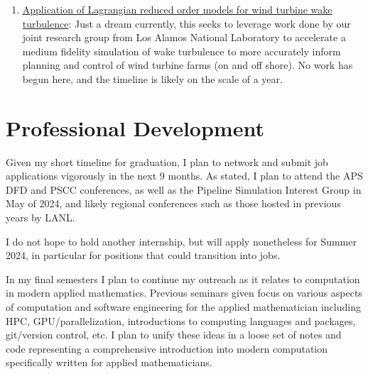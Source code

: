 \documentclass{article}
\begin{document}
\begin{enumerate}
\item \underline{Application of Lagrangian reduced order models for wind turbine wake turbulence}: Just a dream currently, this seeks to leverage work done by our joint research group from Los Alamos National Laboratory to accelerate a medium fidelity simulation of wake turbulence to more accurately inform planning and control of wind turbine farms (on and off shore). No work has begun here, and the timeline is likely on the scale of a year.
    
\end{enumerate}

\section{Professional Development}
Given my short timeline for graduation, I plan to network and submit job applications vigorously in the next 9 months. As stated, I plan to attend the APS DFD and PSCC conferences, as well as the Pipeline Simulation Interest Group in May of 2024, and likely regional conferences such as those hosted in previous years by LANL.

I do not hope to hold another internship, but will apply nonetheless for Summer 2024, in particular for positions that could transition into jobs.

In my final semesters I plan to continue my outreach as it relates to computation in modern applied mathematics. Previous seminars given focus on various aspects of computation and software engineering for the applied mathematician including HPC, GPU/parallelization, introductions to computing languages and packages, git/version control, etc. I plan to unify these ideas in a loose set of notes and code representing a comprehensive introduction into modern computation specifically written for applied mathematicians.
\end{document}
